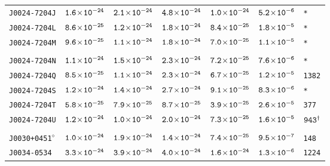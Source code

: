 \begin{longtable}{l | c | c | c | c | c | l}
\scriptsize{\tt{J0024-7204J}} & \scriptsize{$\tt{1.6\!\times\!10^{-24}}$} & \scriptsize{$\tt{2.1\!\times\!10^{-24}}$} & \scriptsize{$\tt{4.8\!\times\!10^{-24}}$} & \scriptsize{$\tt{1.0\!\times\!10^{-24}}$} & \scriptsize{$\tt{5.2\!\times\!10^{-6}}$} & \scriptsize{\tt{*}} \\[-16pt] 
\scriptsize{\tt{J0024-7204L}} & \scriptsize{$\tt{8.6\!\times\!10^{-25}}$} & \scriptsize{$\tt{1.2\!\times\!10^{-24}}$} & \scriptsize{$\tt{1.8\!\times\!10^{-24}}$} & \scriptsize{$\tt{8.4\!\times\!10^{-25}}$} & \scriptsize{$\tt{1.8\!\times\!10^{-5}}$} & \scriptsize{\tt{*}} \\[-16pt] 
\scriptsize{\tt{J0024-7204M}} & \scriptsize{$\tt{9.6\!\times\!10^{-25}}$} & \scriptsize{$\tt{1.1\!\times\!10^{-24}}$} & \scriptsize{$\tt{1.8\!\times\!10^{-24}}$} & \scriptsize{$\tt{7.0\!\times\!10^{-25}}$} & \scriptsize{$\tt{1.1\!\times\!10^{-5}}$} & \scriptsize{\tt{*}} \\[-16pt] 
\\[-20pt] 
\scriptsize{\tt{J0024-7204N}} & \scriptsize{$\tt{1.1\!\times\!10^{-24}}$} & \scriptsize{$\tt{1.5\!\times\!10^{-24}}$} & \scriptsize{$\tt{2.3\!\times\!10^{-24}}$} & \scriptsize{$\tt{7.2\!\times\!10^{-25}}$} & \scriptsize{$\tt{7.6\!\times\!10^{-6}}$} & \scriptsize{\tt{*}} \\[-16pt] 
\scriptsize{\tt{J0024-7204Q}} & \scriptsize{$\tt{8.5\!\times\!10^{-25}}$} & \scriptsize{$\tt{1.1\!\times\!10^{-24}}$} & \scriptsize{$\tt{2.3\!\times\!10^{-24}}$} &\scriptsize{$\tt{6.7\!\times\!10^{-25}}$} & \scriptsize{$\tt{1.2\!\times\!10^{-5}}$} & \scriptsize{\tt{1382}} \\[-16pt] 
\scriptsize{\tt{J0024-7204S}} & \scriptsize{$\tt{1.2\!\times\!10^{-24}}$} & \scriptsize{$\tt{1.4\!\times\!10^{-24}}$} & \scriptsize{$\tt{2.7\!\times\!10^{-24}}$} & \scriptsize{$\tt{9.1\!\times\!10^{-25}}$} & \scriptsize{$\tt{8.3\!\times\!10^{-6}}$} & \scriptsize{\tt{*}} \\[-16pt] 
\scriptsize{\tt{J0024-7204T}} & \scriptsize{$\tt{5.8\!\times\!10^{-25}}$} & \scriptsize{$\tt{7.9\!\times\!10^{-25}}$} & \scriptsize{$\tt{8.7\!\times\!10^{-25}}$} &\scriptsize{$\tt{3.9\!\times\!10^{-25}}$} & \scriptsize{$\tt{2.6\!\times\!10^{-5}}$} & \scriptsize{\tt{377}} \\[-16pt] 
\scriptsize{\tt{J0024-7204U}} & \scriptsize{$\tt{1.2\!\times\!10^{-24}}$} & \scriptsize{$\tt{1.0\!\times\!10^{-24}}$} & \scriptsize{$\tt{2.0\!\times\!10^{-24}}$} & \scriptsize{$\tt{7.3\!\times\!10^{-25}}$} & \scriptsize{$\tt{1.6\!\times\!10^{-5}}$} & \scriptsize{$\tt{943^{\dagger}}$} \\[-16pt] 
\\[-20pt] 
\scriptsize{\tt{J0030+0451}$^{\diamond}$} & \scriptsize{$\tt{1.0\!\times\!10^{-24}}$} &
\scriptsize{$\tt{1.9\!\times\!10^{-24}}$} & \scriptsize{$\tt{1.4\!\times\!10^{-24}}$} &\scriptsize{$\tt{7.4\!\times\!10^{-25}}$} &
\scriptsize{$\tt{9.5\!\times\!10^{-7}}$} & \scriptsize{\tt{148}} \\[-16pt] 
\scriptsize{\tt{J0034-0534}} & \scriptsize{$\tt{3.3\!\times\!10^{-24}}$} & \scriptsize{$\tt{3.9\!\times\!10^{-24}}$} & \scriptsize{$\tt{4.0\!\times\!10^{-24}}$} &\scriptsize{$\tt{1.6\!\times\!10^{-24}}$} & \scriptsize{$\tt{1.3\!\times\!10^{-6}}$} & \scriptsize{\tt{1224}} \\[-16pt] 

\end{longtable}
